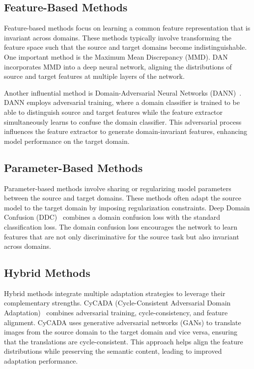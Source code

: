  \subsection{Feature-Based Methods}
 Feature-based methods focus on learning a common feature representation that is invariant across domains. These methods typically involve transforming the feature space such that the source and target domains become indistinguishable. One important method is the Maximum Mean Discrepancy (MMD). DAN~\cite{featureMethod} incorporates MMD into a deep neural network, aligning the distributions of source and target features at multiple layers of the network. %
 
 Another influential method is Domain-Adversarial Neural Networks (DANN)~\cite{featureMethod2}. DANN employs adversarial training, where a domain classifier is trained to be able to distinguish source and target features while the feature extractor simultaneously learns to confuse the domain classifier. This adversarial process influences the feature extractor to generate domain-invariant features, enhancing model performance on the target domain.
 
 \subsection{Parameter-Based Methods}
 Parameter-based methods involve sharing or regularizing model parameters between the source and target domains. These methods often adapt the source model to the target domain by imposing regularization constraints. Deep Domain Confusion (DDC)~\cite{parameterMethod} combines a domain confusion loss with the standard classification loss. The domain confusion loss encourages the network to learn features that are not only discriminative for the source task but also invariant across domains. %

\subsection{Hybrid Methods}
Hybrid methods integrate multiple adaptation strategies to leverage their complementary strengths. CyCADA (Cycle-Consistent Adversarial Domain Adaptation)~\cite{hybridMethod} combines adversarial training, cycle-consistency, and feature alignment. CyCADA uses generative adversarial networks (GANs) to translate images from the source domain to the target domain and vice versa, ensuring that the translations are cycle-consistent. This approach helps align the feature distributions while preserving the semantic content, leading to improved adaptation performance.

